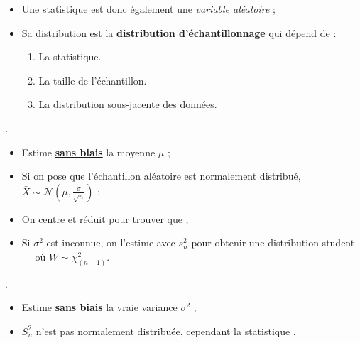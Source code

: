 \documentclass[10pt, french]{article}
\begin{document}
\begin{multicols*}{2}
\begin{definitionNOHFILL}[Statistique $T_{n}$]
\begin{itemize}
\item	Une statistique est donc également une \textit{variable aléatoire} ;
\item	Sa distribution est la \textbf{distribution d'échantillonnage} qui dépend de :
	\begin{enumerate}
	\item	La statistique.
	\item	La taille de l'échantillon.
	\item	La distribution sous-jacente des données.
	\end{enumerate}
\end{itemize}
\end{definitionNOHFILL}


\begin{definitionNOHFILLprop}
.

\begin{itemize}
	\item	Estime \textbf{\underline{sans biais}} la moyenne $\mu$ ;
	\item	Si on pose que l'échantillon aléatoire est normalement distribué, $\bar{X}	\sim \mathcal{N}(\mu, \frac{\sigma}{\sqrt{n}})$ ;
	\item	On centre et réduit pour trouver que  ;
	\item	Si $\sigma^{2}$ est inconnue, on l'estime avec $s^{2}_{n}$ pour obtenir une distribution student--- où $W \sim \chi^{2}_{(n - 1)}$.
\end{itemize}
\end{definitionNOHFILLprop}

\begin{definitionNOHFILLprop}
.

\begin{itemize}
	\item	Estime \underline{\textbf{sans biais}} la vraie variance $\sigma^{2}$ ;
	\item	$S^{2}_{n}$ n'est pas normalement distribuée, cependant la statistique .
\end{itemize}
\end{definitionNOHFILLprop}


\end{multicols*}
\end{document}
